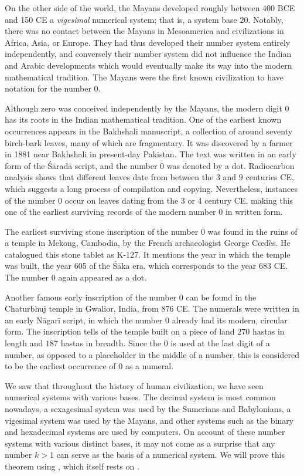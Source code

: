 On the other side of the world, the Mayans developed roughly between 400 BCE and 150 CE a \emph{vigesimal} numerical system; that is, a system base $20$. Notably, there was no contact between the Mayans in Mesoamerica and civilizations in Africa, Asia, or Europe. They had thus developed their number system entirely independently, and conversely their number system did not influence the Indian and Arabic developments which would eventually make its way into the modern mathematical tradition. The Mayans were the first known civilization to have notation for the number $0$.

Although zero was conceived independently by the Mayans, the modern digit $0$
has its roots in the Indian mathematical tradition. One of the earliest known
occurrences appears in the Bakhshali manuscript, a collection of around seventy
birch-bark leaves, many of which are fragmentary. It was discovered by a farmer in
1881 near Bakhshali in present-day Pakistan. The text was written in an early form of the Śāradā script, and the number $0$ was denoted by a dot. Radiocarbon analysis shows that different leaves date from between the $3$\suprd{} and $9$\supth{} centuries CE, which suggests a long process of compilation and copying. Nevertheless, instances of the number $0$ occur on leaves dating from the 3\suprd{} or $4$\supth{} century CE, making this one of the earliest surviving records of the modern number $0$ in written form.

The earliest surviving stone inscription of the number $0$ was found in the ruins of a temple in Mekong, Cambodia, by the French archaeologist George Cœdès. He catalogued this stone tablet as K-127. It mentions the year in which the temple was built, the year 605 of the Śāka era, which corresponds to the year 683 CE. The number $0$ again appeared as a dot.

Another famous early inscription of the number $0$ can be found in the Chaturbhuj temple in Gwalior, India, from 876 CE. The numerals were written in an early Nāgarī script, in which the number $0$ already had its modern, circular form. The inscription tells of the temple built on a piece of land $270$ hastas in length and $187$ hastas in breadth. Since the $0$ is used at the last digit of a number, as opposed to a placeholder in the middle of a number, this is considered to be the earliest occurrence of $0$ as a numeral.

We saw that throughout the history of human civilization, we have seen numerical systems with various bases. The decimal system is most common nowadays, a sexagesimal system was used by the Sumerians and Babylonians, a vigesimal system was used by the Mayans, and other systems such as the binary and hexadecimal systems are used by computers. On account of these number systems with various distinct bases, it may not come as a surprise that any number $k>1$ can serve as the basis of a numerical system. We will prove this theorem using , which itself rests on .

